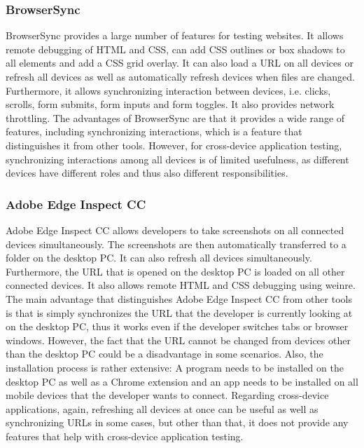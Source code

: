 \subsubsection{BrowserSync}

BrowserSync provides a large number of features for testing websites. It allows remote debugging of HTML and CSS, can add CSS outlines or box shadows to all elements and add a CSS grid overlay. It can also load a URL on all devices or refresh all devices as well as automatically refresh devices when files are changed. Furthermore, it allows synchronizing interaction between devices, i.e. clicks, scrolls, form submits, form inputs and form toggles. It also provides network throttling. The advantages of BrowserSync are that it provides a wide range of features, including synchronizing interactions, which is a feature that distinguishes it from other tools. However, for cross-device application testing, synchronizing interactions among all devices is of limited usefulness, as different devices have different roles and thus also different responsibilities.

\subsubsection{Adobe Edge Inspect CC}

Adobe Edge Inspect CC allows developers to take screenshots on all connected devices simultaneously. The screenshots are then automatically transferred to a folder on the desktop PC. It can also refresh all devices simultaneously. Furthermore, the URL that is opened on the desktop PC is loaded on all other connected devices. It also allows remote HTML and CSS debugging using weinre. The main advantage that distinguishes Adobe Edge Inspect CC from other tools is that is simply synchronizes the URL that the developer is currently looking at on the desktop PC, thus it works even if the developer switches tabs or browser windows. However, the fact that the URL cannot be changed from devices other than the desktop PC could be a disadvantage in some scenarios. Also, the installation process is rather extensive: A program needs to be installed on the desktop PC as well as a Chrome extension and an app needs to be installed on all mobile devices that the developer wants to connect. Regarding cross-device applications, again, refreshing all devices at once can be useful as well as synchronizing URLs in some cases, but other than that, it does not provide any features that help with cross-device application testing.

